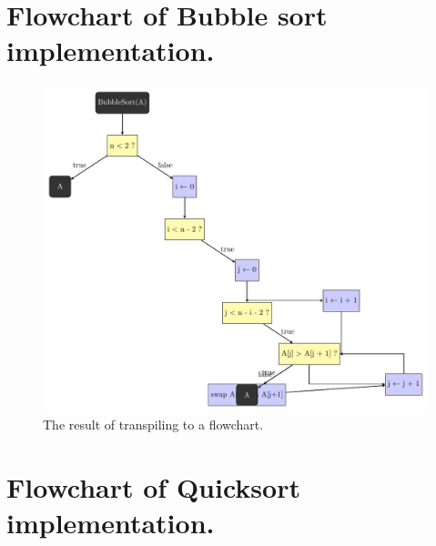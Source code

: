 \section{Flowchart of Bubble sort implementation.}
\label{Flowchart of Bubble sort implementation.}

\begin{figure}[ht!]
    \centering
    \includegraphics[scale=.6]{assets/chapter6/sort/BubbleSort_ibp.pdf}
    \caption{The result of transpiling  to a flowchart.}
    \label{bubbleSortIBP}
\end{figure}

\section{Flowchart of Quicksort implementation.}
\label{Flowchart of Quicksort implementation.}

